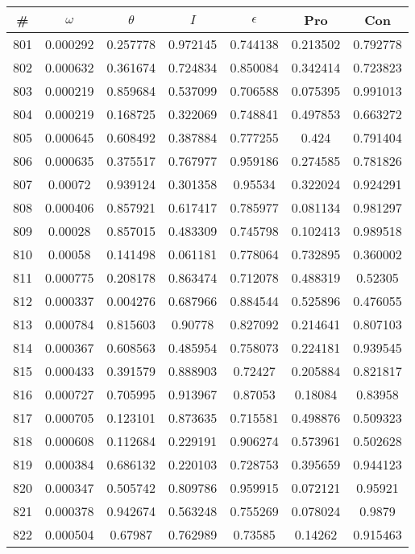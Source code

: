 \newpage
\begin{table}
\begin{tabular}{c|c|c|c|c|c|c}
\# & $\omega$ & $\theta$ & $I$ & $\epsilon$ & Pro & Con\\
\hline
801 & 0.000292 & 0.257778 & 0.972145 & 0.744138 & 0.213502 & 0.792778\\
802 & 0.000632 & 0.361674 & 0.724834 & 0.850084 & 0.342414 & 0.723823\\
803 & 0.000219 & 0.859684 & 0.537099 & 0.706588 & 0.075395 & 0.991013\\
804 & 0.000219 & 0.168725 & 0.322069 & 0.748841 & 0.497853 & 0.663272\\
805 & 0.000645 & 0.608492 & 0.387884 & 0.777255 & 0.424 & 0.791404\\
806 & 0.000635 & 0.375517 & 0.767977 & 0.959186 & 0.274585 & 0.781826\\
807 & 0.00072 & 0.939124 & 0.301358 & 0.95534 & 0.322024 & 0.924291\\
808 & 0.000406 & 0.857921 & 0.617417 & 0.785977 & 0.081134 & 0.981297\\
809 & 0.00028 & 0.857015 & 0.483309 & 0.745798 & 0.102413 & 0.989518\\
810 & 0.00058 & 0.141498 & 0.061181 & 0.778064 & 0.732895 & 0.360002\\
811 & 0.000775 & 0.208178 & 0.863474 & 0.712078 & 0.488319 & 0.52305\\
812 & 0.000337 & 0.004276 & 0.687966 & 0.884544 & 0.525896 & 0.476055\\
813 & 0.000784 & 0.815603 & 0.90778 & 0.827092 & 0.214641 & 0.807103\\
814 & 0.000367 & 0.608563 & 0.485954 & 0.758073 & 0.224181 & 0.939545\\
815 & 0.000433 & 0.391579 & 0.888903 & 0.72427 & 0.205884 & 0.821817\\
816 & 0.000727 & 0.705995 & 0.913967 & 0.87053 & 0.18084 & 0.83958\\
817 & 0.000705 & 0.123101 & 0.873635 & 0.715581 & 0.498876 & 0.509323\\
818 & 0.000608 & 0.112684 & 0.229191 & 0.906274 & 0.573961 & 0.502628\\
819 & 0.000384 & 0.686132 & 0.220103 & 0.728753 & 0.395659 & 0.944123\\
820 & 0.000347 & 0.505742 & 0.809786 & 0.959915 & 0.072121 & 0.95921\\
821 & 0.000378 & 0.942674 & 0.563248 & 0.755269 & 0.078024 & 0.9879\\
822 & 0.000504 & 0.67987 & 0.762989 & 0.73585 & 0.14262 & 0.915463\\

\end{tabular}
\end{table}
